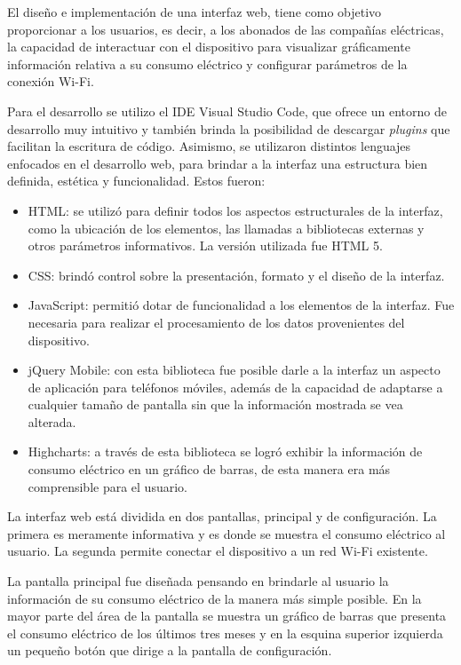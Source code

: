 El diseño e implementación de una interfaz web, tiene como objetivo proporcionar a los usuarios, es decir, a los abonados de las compañías eléctricas, la capacidad de interactuar con el dispositivo para visualizar gráficamente información relativa a su consumo eléctrico y configurar parámetros de la conexión Wi-Fi.

Para el desarrollo se utilizo el IDE Visual Studio Code, que ofrece un entorno de desarrollo muy intuitivo y también brinda la posibilidad de descargar \textit{plugins} que facilitan la escritura de código. Asimismo, se utilizaron distintos lenguajes enfocados en el desarrollo web, para brindar a la interfaz una estructura bien definida, estética y funcionalidad. Estos fueron:

\begin{itemize}
	\item HTML: se utilizó para definir todos los aspectos estructurales de la interfaz, como la ubicación de los elementos, las llamadas a bibliotecas externas y otros parámetros informativos. La versión utilizada fue HTML 5.
	\item CSS: brindó control sobre la presentación, formato y el diseño de la interfaz.
	\item JavaScript: permitió dotar de funcionalidad a los elementos de la interfaz. Fue necesaria para realizar el procesamiento de los datos provenientes del dispositivo.
	\item jQuery Mobile: con esta biblioteca fue posible darle a la interfaz un aspecto de aplicación para teléfonos móviles, además de la capacidad de adaptarse a cualquier tamaño de pantalla sin que la información mostrada se vea alterada.
	\item Highcharts: a través de esta biblioteca se logró exhibir la información de consumo eléctrico en un gráfico de barras, de esta manera era más comprensible para el usuario.\end{itemize}

La interfaz web está dividida en dos pantallas, principal y de configuración. La primera es meramente informativa y es donde se muestra el consumo eléctrico al usuario. La segunda permite conectar el dispositivo a un red Wi-Fi existente.

La pantalla principal fue diseñada pensando en brindarle al usuario la información de su consumo eléctrico de la manera más simple posible. En la mayor parte del área de la pantalla se muestra un gráfico de barras que presenta el consumo eléctrico de los últimos tres meses y en la esquina superior izquierda un pequeño botón que dirige a la pantalla de configuración.

